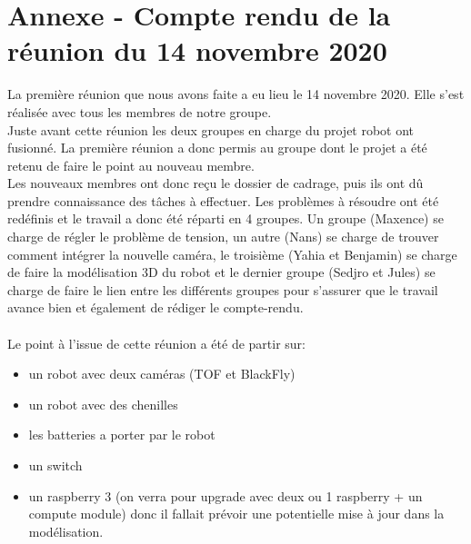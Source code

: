 \documentclass{PackagerQualityN}
\begin{document}
\appendix
\section*{Annexe - Compte rendu de la réunion du 14 novembre 2020}
La première réunion que nous avons faite a eu lieu le 14 novembre 2020. Elle s'est réalisée avec tous les membres de notre groupe.
\\

Juste avant cette réunion les deux groupes en charge du projet robot ont fusionné. La première réunion a donc permis au groupe dont le projet a été retenu de faire le point au nouveau membre. 
\\
Les nouveaux membres ont donc reçu le dossier de cadrage, puis ils ont dû prendre connaissance des tâches à effectuer. Les problèmes à résoudre ont été redéfinis et le travail a donc été réparti en 4 groupes. Un groupe (Maxence) se charge de régler le problème de tension, un autre (Nans) se charge de trouver comment intégrer la nouvelle caméra, le troisième (Yahia et Benjamin) se charge de faire la modélisation 3D du robot et le dernier groupe (Sedjro et Jules) se charge de faire le lien entre les différents groupes pour s'assurer que le travail avance bien et également de rédiger le compte-rendu.
\\
\\
Le point à l'issue de cette réunion a été de partir sur:\\
\begin{itemize}
\item  un robot avec deux caméras (TOF et BlackFly)\\
\item   un robot avec des chenilles\\
\item  les batteries a porter par le robot\\
\item   un switch\\
\item   un raspberry 3 (on verra pour upgrade avec deux ou 1 raspberry + un compute module) donc il fallait prévoir une potentielle mise à jour dans la modélisation.
\end{itemize}

\newp
\end{document}
